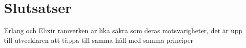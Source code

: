 \documentclass[12pt]{article}
\begin{document}
    
    
\section{Slutsatser}




Erlang och Elixir ramverken är lika säkra som deras motsvarigheter, det är upp till utvecklaren att täppa till samma håll med samma principer
	
\end{document}
